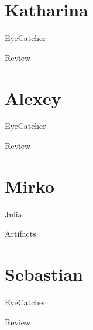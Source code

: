 \documentclass[aspectratio=169,10pt]{beamer}
\begin{document}
\section{Katharina}
\begin{frame}[fragile]{EyeCatcher}
\end{frame}
\begin{frame}[t,fragile]{Review}
\end{frame}

\section{Alexey}
\begin{frame}[fragile]{EyeCatcher}
\end{frame}
\begin{frame}[t,fragile]{Review}
\end{frame}

\section{Mirko}
\begin{frame}[fragile]{Julia}
  \vspace*{2em}
  \hspace*{.025\textwidth} %
  \begin{tikzpicture}
    
  \end{tikzpicture}
\end{frame}
\begin{frame}[t,fragile]{Artifacts }
  \vspace*{1.5em}
  \hspace*{-.075\textwidth} %
  \begin{tikzpicture}
    
  \end{tikzpicture}
\end{frame}

\section{Sebastian}
\begin{frame}[fragile]{EyeCatcher}
\end{frame}
\begin{frame}[t,fragile]{Review}
\end{frame}
\end{document}
